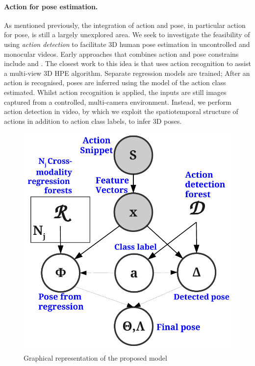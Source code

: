\paragraph{Action for pose estimation.}
As mentioned previously, the integration of action and pose, in particular action for pose, is still a largely unexplored area. We seek to investigate the feasibility of using \emph{action detection} to facilitate 3D human pose estimation in uncontrolled and monocular videos.
Early approaches that combines action and pose constrains include \cite{Yu2010} and \cite{Raja2011}.
The closest work to this idea is \cite{Yao2012} that uses action recognition to assist a multi-view 3D HPE algorithm. Separate regression models are trained; After an action is recognised, poses are inferred using the model of the action class estimated. 
Whilst action recognition is applied, the inputs are still images captured from a controlled, multi-camera environment. 
Instead, we perform action detection in video, by which we exploit the spatiotemporal structure of actions in addition to action class labels, to infer 3D poses.

\begin{figure}[ht]
	\centering
	\includegraphics[width=0.35\linewidth]{fig/body/figure4.pdf}
	\caption{Graphical representation of the proposed model} 
	\label{fig/body/figure4gm}
\end{figure}

